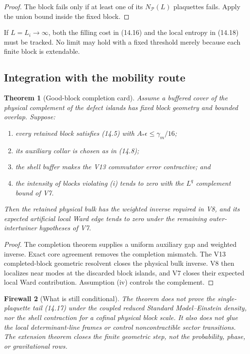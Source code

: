 \documentclass[11pt]{article}
\newtheorem{theorem}{Theorem}[section]
\newtheorem{firewall}[theorem]{Firewall}
\begin{document}
\begin{proof}
The block fails only if at least one of its
\(N_{\mathcal P}(L)\) plaquettes fails.  Apply the union bound inside the
fixed block.
\end{proof}

If \(L=L_i\to\infty\), both the filling cost in (14.16) and the local
entropy in (14.18) must be tracked.  No limit may hold with a fixed
threshold merely because each finite block is extendable.

\subsection{Integration with the mobility route}

\begin{theorem}[Good-block completion card]
\label{thm:v11v14-good-block-card}
Assume a buffered cover of the physical complement of the defect islands
has fixed block geometry and bounded overlap.  Suppose:
\begin{enumerate}[label=\textnormal{(\roman*)}]
\item every retained block satisfies (14.5) with
\(A_*\epsilon\leq\gamma_m/16\);
\item its auxiliary collar is chosen as in (14.8);
\item the shell buffer makes the V13 commutator error contractive; and
\item the intensity of blocks violating (i) tends to zero with the
\(L^q\) complement bound of V7.
\end{enumerate}
Then the retained physical bulk has the weighted inverse required in V8,
and its expected artificial local Ward edge tends to zero under the
remaining outer-intertwiner hypotheses of V7.
\end{theorem}

\begin{proof}
The completion theorem supplies a uniform auxiliary gap and weighted
inverse.  Exact core agreement removes the completion mismatch.  The V13
completed-block geometric resolvent closes the physical bulk inverse.
V8 then localizes near modes at the discarded block islands, and V7 closes
their expected local Ward contribution.  Assumption (iv) controls the
complement.
\end{proof}

\begin{firewall}[What is still conditional]
\label{fw:v11v14-conditional}
The theorem does not prove the single-plaquette tail (14.17) under the
coupled reduced Standard Model--Einstein density, nor the shell
contraction for a cofinal physical block scale.  It also does not glue
the local determinant-line frames or control noncontractible sector
transitions.  The extension theorem closes the finite geometric step,
not the probability, phase, or gravitational rows.
\end{firewall}
\end{document}
